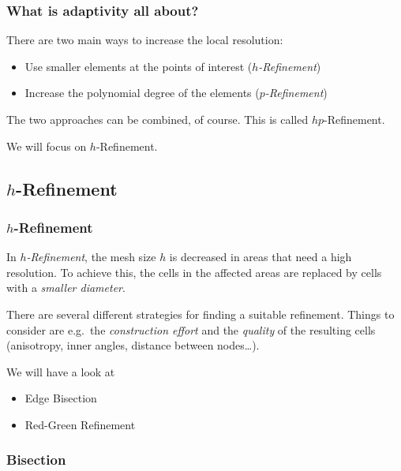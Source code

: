 \begin{frame}
  \frametitle<presentation>{What is adaptivity all about?}
  There are two main ways to increase the local resolution:
  \begin{itemize}
    \item Use smaller elements at the points of interest (\emph{$h$-Refinement})
    \item Increase the polynomial degree of the elements (\emph{$p$-Refinement})
  \end{itemize}

  The two approaches can be combined, of course. This is called $hp$-Refinement.

  We will focus on $h$-Refinement.

\end{frame}

\subsection{$h$-Refinement}

\begin{frame}
  \frametitle<presentation>{$h$-Refinement}
  In \emph{$h$-Refinement}, the mesh size $h$ is decreased in areas that need a high resolution. To achieve this, the cells in the affected areas are replaced by cells with a \emph{smaller diameter}.

  There are several different strategies for finding a suitable refinement. Things to consider are e.g.~the \emph{construction effort} and the \emph{quality} of the resulting cells (anisotropy, inner angles, distance between nodes\ldots).

  We will have a look at
  \begin{itemize}
    \item Edge Bisection
    \item Red-Green Refinement
  \end{itemize}
\end{frame}

\subsubsection*{Bisection}

